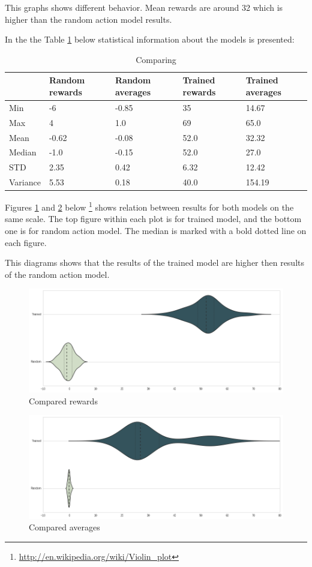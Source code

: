 \documentclass[a4paper,oneside,dvipsnames]{article}
\begin{document}
This graphs shows different behavior. Mean rewards are around 32 which is higher than the random action model results.

In the the Table \ref{table:comparing} below statistical information about the models is presented:

\begin{table}[H]
    \centering
    \begin{tabular}{ | l | l | l | l | l | }
    \hline
     & Random rewards & Random averages & Trained rewards & Trained averages \\ \hline
    Min & -6 & -0.85 & 35 & 14.67 \\ \hline
    Max & 4 & 1.0 & 69 & 65.0 \\ \hline
    Mean & -0.62 & -0.08 & 52.0 & 32.32 \\ \hline
    Median & -1.0 & -0.15 & 52.0 & 27.0 \\ \hline
    STD & 2.35 & 0.42 & 6.32 & 12.42 \\ \hline
    Variance & 5.53 & 0.18 & 40.0 & 154.19 \\ \hline
    \end{tabular}
    \caption{Comparing}
    \label{table:comparing}
\end{table}

Figures \ref{fig:compared_rewards} and \ref{fig:compared_averages} below
\footnote{\url{http://en.wikipedia.org/wiki/Violin_plot}} 
shows relation between results for both models on the same scale. The top figure within each plot is for trained model, and the bottom one is for random action model. The median is marked with a bold dotted line on each figure.

This diagrams shows that the results of the trained model are higher then results of the random action model.

\begin{figure}[H]
    \centering
    \includegraphics[scale=0.53]{compare_rewards_white.png}
    \caption{Compared rewards}
    \label{fig:compared_rewards}
\end{figure}

\begin{figure}[H]
    \centering
    \includegraphics[scale=0.53]{compare_rgstats_white.png}
    \caption{Compared averages}
    \label{fig:compared_averages}
\end{figure}
\end{document}
